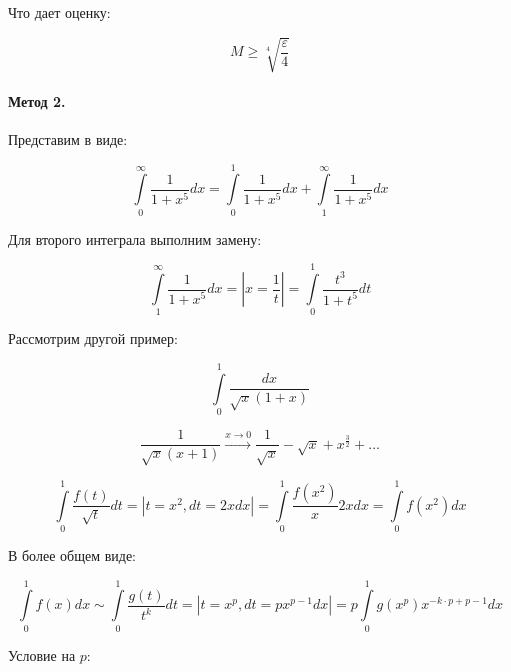 \documentclass[10pt,a4paper]{article}
\begin{document}
	Что дает оценку:
	
	\begin{equation}
		M \geqslant\sqrt[4]{\frac{\varepsilon}{4}}
	\end{equation}
	
	\paragraph{Метод 2.}
	
	Представим в виде:
	
	\begin{equation}
		\int\limits_{0}^{\infty}\frac{1}{1 + x^{5}}dx = 
		\int\limits_{0}^{1}\frac{1}{1 + x^{5}}dx + 
		\int\limits_{1}^{\infty}\frac{1}{1 + x^{5}}dx
	\end{equation}
	
	Для второго интеграла выполним замену:
	
	\begin{equation}
		\int\limits_{1}^{\infty}\frac{1}{1 + x^{5}}dx = \left|x = \frac{1}{t}
		\right| = \int\limits_{0}^{1}\frac{t^{3}}{1 + t^{5}}dt
	\end{equation}
	
	
	Рассмотрим другой пример:
	
	\begin{equation}
		\int\limits_{0}^{1}\frac{dx}{\sqrt{x}\left(1 + x\right)}
	\end{equation}
	
	\begin{equation}
		\frac{1}{\sqrt{x}\left(x + 1\right)} \xrightarrow{x \to 0} 
		\frac{1}{\sqrt{x}} - \sqrt{x} + x^{\frac{3}{2}} + \ldots
	\end{equation}
	
	\begin{equation}
		\int\limits_{0}^{1}\frac{f\left(t\right)}{\sqrt{t}}dt = 
		\left|t = x^{2}, dt = 2xdx\right| = 
		\int\limits_{0}^{1}\frac{f\left(x^{2}\right)}{x}2xdx	 = 
		\int\limits_{0}^{1}f\left(x^2\right)dx
	\end{equation}
	
	В более общем виде:
	
	\begin{equation}
		\int\limits_{0}^{1}f\left(x\right)dx \sim 
		\int\limits_{0}^{1}\frac{g\left(t\right)}{t^{k}}dt = 
		\left|t = x^{p}, dt = px^{p-1}dx\right| = 
		p\int\limits_{0}^{1}g\left(x^{p}\right)x^{-k\cdot p + p - 1}dx
	\end{equation}
	
	Условие на $p$:
	
\end{document}
